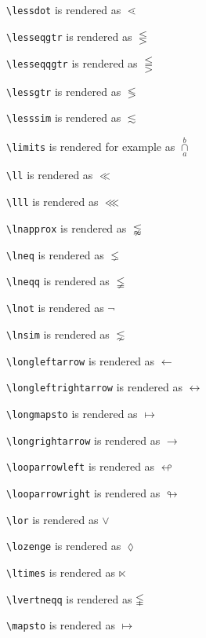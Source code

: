 \texttt{\textbackslash lessdot} is rendered as $\lessdot$

\texttt{\textbackslash lesseqgtr} is rendered as $\lesseqgtr$

\texttt{\textbackslash lesseqqgtr} is rendered as $\lesseqqgtr$

\texttt{\textbackslash lessgtr} is rendered as $\lessgtr$

\texttt{\textbackslash lesssim} is rendered as $\lesssim$

\texttt{\textbackslash limits} is rendered for example as $\mathop\cap\limits_a^b$

\texttt{\textbackslash ll} is rendered as $\ll$

\texttt{\textbackslash lll} is rendered as $\lll$

\texttt{\textbackslash lnapprox} is rendered as $\lnapprox$

\texttt{\textbackslash lneq} is rendered as $\lneq$

\texttt{\textbackslash lneqq} is rendered as $\lneqq$

\texttt{\textbackslash lnot} is rendered as $\lnot$

\texttt{\textbackslash lnsim} is rendered as $\lnsim$





\texttt{\textbackslash longleftarrow} is rendered as $\longleftarrow$

\texttt{\textbackslash longleftrightarrow} is rendered as $\longleftrightarrow$



\texttt{\textbackslash longmapsto} is rendered as $\longmapsto$

\texttt{\textbackslash longrightarrow} is rendered as $\longrightarrow$



\texttt{\textbackslash looparrowleft} is rendered as $\looparrowleft$

\texttt{\textbackslash looparrowright} is rendered as $\looparrowright$

\texttt{\textbackslash lor} is rendered as $\lor$

\texttt{\textbackslash lozenge} is rendered as $\lozenge$

\texttt{\textbackslash ltimes} is rendered as $\ltimes$

\texttt{\textbackslash lvertneqq} is rendered as $\lvertneqq$

\texttt{\textbackslash mapsto} is rendered as $\mapsto$

